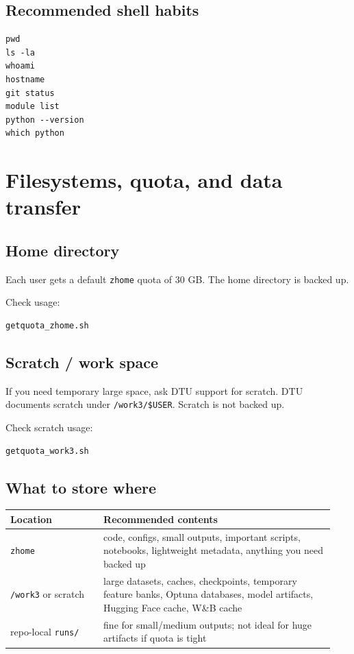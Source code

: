 \documentclass[11pt,a4paper]{article}
\begin{document}
\subsection{Recommended shell habits}

\begin{lstlisting}[style=shell]
pwd
ls -la
whoami
hostname
git status
module list
python --version
which python
\end{lstlisting}

\section{Filesystems, quota, and data transfer}

\subsection{Home directory}

Each user gets a default \texttt{zhome} quota of 30 GB. The home directory is backed up.

Check usage:

\begin{lstlisting}[style=shell]
getquota_zhome.sh
\end{lstlisting}

\subsection{Scratch / work space}

If you need temporary large space, ask DTU support for scratch. DTU documents scratch under \texttt{/work3/\$USER}. Scratch is not backed up.

Check scratch usage:

\begin{lstlisting}[style=shell]
getquota_work3.sh
\end{lstlisting}

\subsection{What to store where}

\begin{longtable}{p{0.27\linewidth} p{0.67\linewidth}}
\toprule
Location & Recommended contents \\
\midrule
\texttt{zhome} & code, configs, small outputs, important scripts, notebooks, lightweight metadata, anything you need backed up \\
\texttt{/work3} or scratch & large datasets, caches, checkpoints, temporary feature banks, Optuna databases, model artifacts, Hugging Face cache, W\&B cache \\
repo-local \texttt{runs/} & fine for small/medium outputs; not ideal for huge artifacts if quota is tight \\
\bottomrule
\end{longtable}
\end{document}
